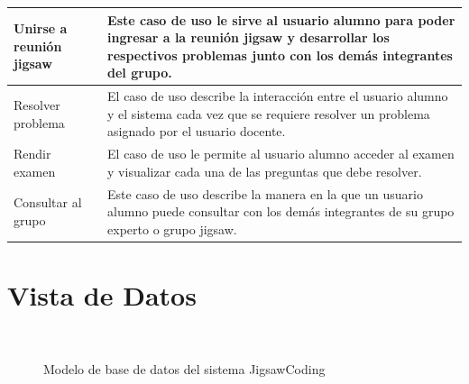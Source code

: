 \begin{longtable}{L{4cm}L{9cm}}
	\midrule
	Unirse a reunión jigsaw & Este caso de uso le sirve al usuario alumno para poder ingresar a la reunión jigsaw y desarrollar los respectivos problemas junto con los demás integrantes del grupo. \\
	\midrule
	Resolver problema & El caso de uso describe la interacción entre el usuario alumno y el sistema cada vez que se requiere resolver un problema asignado por el usuario docente.\\
	\midrule
	Rendir examen & El caso de uso le permite al usuario alumno acceder al examen y visualizar cada una de las preguntas que debe resolver.\\
	\midrule
	Consultar al grupo & Este caso de uso describe la manera en la que un usuario alumno puede consultar con los demás integrantes de su grupo experto o grupo jigsaw.\\
	\bottomrule[0.8mm]
\end{longtable}

\clearpage
\section{Vista de Datos}
\begin{figure}[!h]
  \centering
  \\
  \caption[Modelo de datos]{Modelo de base de datos del sistema JigsawCoding}\label{fig:modelo_de_datos}
\end{figure}
